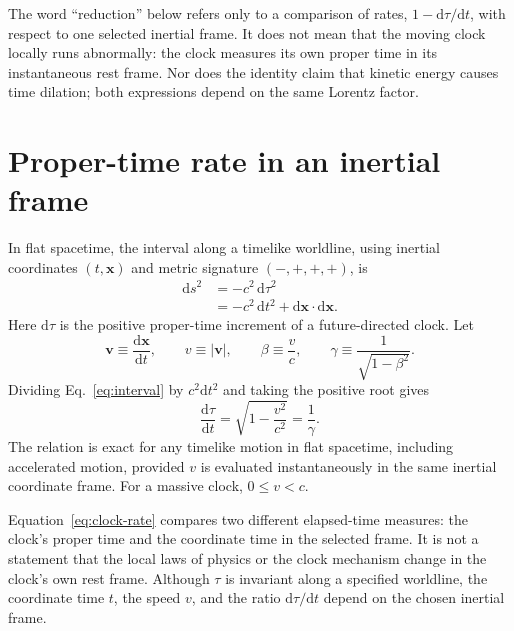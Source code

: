 \documentclass[12pt]{article}
\begin{document}
The word ``reduction'' below refers only to a comparison of rates, $1-\mathrm{d}\tau/\mathrm{d}t$, with respect to one selected inertial frame. It does not mean that the moving clock locally runs abnormally: the clock measures its own proper time in its instantaneous rest frame. Nor does the identity claim that kinetic energy causes time dilation; both expressions depend on the same Lorentz factor.

\section{Proper-time rate in an inertial frame}

In flat spacetime, the interval along a timelike worldline, using inertial coordinates $(t,\mathbf{x})$ and metric signature $(-,+,+,+)$, is
\begin{equation}
  \begin{aligned}
    \mathrm{d}s^2&=-c^2\,\mathrm{d}\tau^2\\
    &=-c^2\,\mathrm{d}t^2+\mathrm{d}\mathbf{x}\mathbin{\cdot}\mathrm{d}\mathbf{x}.
  \end{aligned}
  \label{eq:interval}
\end{equation}
Here $\mathrm{d}\tau$ is the positive proper-time increment of a future-directed clock. Let
\begin{equation}
  \mathbf{v}\equiv\frac{\mathrm{d}\mathbf{x}}{\mathrm{d}t},
  \qquad
  v\equiv|\mathbf{v}|,
  \qquad
  \beta\equiv\frac{v}{c},
  \qquad
  \gamma\equiv\frac{1}{\sqrt{1-\beta^2}}.
  \label{eq:kinematic-variables}
\end{equation}
Dividing Eq.~\eqref{eq:interval} by $c^2\mathrm{d}t^2$ and taking the positive root gives
\begin{equation}
  \boxed{\frac{\mathrm{d}\tau}{\mathrm{d}t}
  =\sqrt{1-\frac{v^2}{c^2}}
  =\frac{1}{\gamma}.}
  \label{eq:clock-rate}
\end{equation}
The relation is exact for any timelike motion in flat spacetime, including accelerated motion, provided $v$ is evaluated instantaneously in the same inertial coordinate frame. For a massive clock, $0\leq v<c$.

Equation~\eqref{eq:clock-rate} compares two different elapsed-time measures: the clock's proper time and the coordinate time in the selected frame. It is not a statement that the local laws of physics or the clock mechanism change in the clock's own rest frame. Although $\tau$ is invariant along a specified worldline, the coordinate time $t$, the speed $v$, and the ratio $\mathrm{d}\tau/\mathrm{d}t$ depend on the chosen inertial frame.
\end{document}
